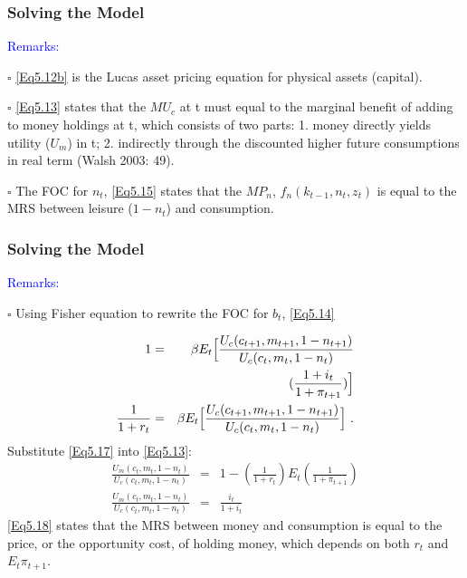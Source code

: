 \documentclass[handout]{beamer}
\begin{document}
\begin{frame}
\frametitle{Solving the Model} \vskip 0.1in

\textcolor{blue}{Remarks:}\\\vskip 0.1in

$\square$  \eqref{Eq5.12b} is the Lucas asset pricing equation for
physical assets (capital).\\\vskip 0.1in

$\square$  \eqref{Eq5.13} states that the $MU_{c}$ at t must equal
to the marginal benefit of adding to money holdings at t, which
consists of two parts: 1. money directly yields utility ($U_{m}$) in
t; 2. indirectly through the discounted higher future consumptions
in real term (Walsh 2003: 49).\\\vskip 0.1in


$\square$ The FOC for $n_{t}$, \eqref{Eq5.15} states that the
$MP_{n}$, $f_{n}(k_{t-1},n_{t},z_{t})$ is equal to the MRS between
leisure ($1-n_{t}$) and consumption.


\end{frame}

\begin{frame}
\frametitle{Solving the Model} \vskip 0.05in

\textcolor{blue}{Remarks:}

$\square$ Using Fisher equation to rewrite the FOC for $b_{t}$, \eqref{Eq5.14}

{\scriptsize{
\begin{eqnarray}
1 &=& \beta E_{t}
\Bigl[\frac{U_{c}(c_{t+1},m_{t+1},1-n_{t+1})}{U_{c}(c_{t},m_{t},1-n_{t})}
\nonumber \\ && (\frac{1+i_{t}}{1+\pi_{t+1}}) \Bigr]\label{Eq5.16}\\
\frac{1}{1+r_{t}} &=&  \beta E_{t}
\Bigl[\frac{U_{c}(c_{t+1},m_{t+1},1-n_{t+1})}{U_{c}(c_{t},m_{t},1-n_{t})}
\Bigr] ~. \label{Eq5.17}
\end{eqnarray}
Substitute \eqref{Eq5.17} into \eqref{Eq5.13}:
\begin{eqnarray}
\frac{U_{m}(c_{t},m_{t},1-n_{t})}{U_{c}(c_{t},m_{t},1-n_{t})} &=& 1
-(\frac{1}{1+r_{t}})E_t(\frac{1}{1+\pi_{t+1}})\label{Eq5.18}\\
\frac{U_{m}(c_{t},m_{t},1-n_{t})}{U_{c}(c_{t},m_{t},1-n_{t})} &=&
\frac{i_{t}}{1+i_{t}} \label{Eq5.19}
\end{eqnarray}}}
{\small{\eqref{Eq5.18} states that the MRS between money and consumption
is equal to the price, or the opportunity cost, of holding money,
which depends on both $r_{t}$ and $E_{t}\pi_{t+1}$.}}

\end{frame}
\end{document}

